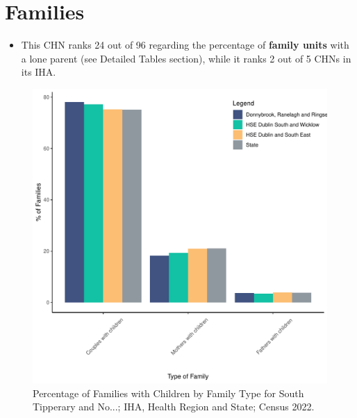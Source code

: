 \documentclass{article}
\begin{document}
\section{Families}\label{sect:Fam}
\begin{itemize}
\item This CHN ranks  24 out of 96 regarding the percentage of \textbf{family units} with a lone parent (see Detailed Tables section), while it ranks   2 out of 5 CHNs in its IHA.
\end{itemize}
\begin{figure}[H]
	\centering
	\includegraphics[width = 150mm]{../figures/FamED.pdf}
	\caption{Percentage of Families with Children by Family Type for South Tipperary and No...; IHA, Health Region and State; Census 2022.}
	\label{fig:vbnv}
	\end{figure}
	
\end{document}
